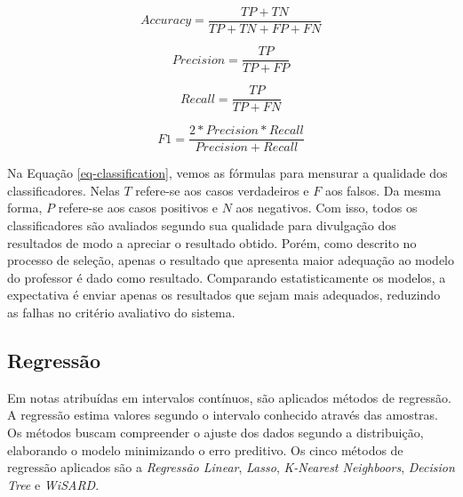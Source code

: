 \begin{equation}
Accuracy = \frac{TP+TN}{TP+TN+FP+FN}
\label{eq-classification}
\end{equation}

\begin{equation*}
Precision = \frac{TP}{TP+FP}
\end{equation*}

\begin{equation*}
Recall = \frac{TP}{TP+FN}
\end{equation*}

\begin{equation*}
F{1} = \frac{2*Precision*Recall}{Precision+Recall}
\end{equation*}

Na Equação \ref{eq-classification}, vemos as fórmulas para mensurar a qualidade dos classificadores. Nelas $ T $ refere-se aos casos verdadeiros e $ F $ aos falsos. Da mesma forma, $ P $ refere-se aos casos positivos e $ N $ aos negativos. Com isso, todos os classificadores são avaliados segundo sua qualidade para divulgação dos resultados de modo a apreciar o resultado obtido. Porém, como descrito no processo de seleção, apenas o resultado que apresenta maior adequação ao modelo do professor é dado como resultado. Comparando estatisticamente os modelos, a expectativa é enviar apenas os resultados que sejam mais adequados, reduzindo as falhas no critério avaliativo do sistema.

\subsection{Regressão}
\label{subsec-regressao}

Em notas atribuídas em intervalos contínuos, são aplicados métodos de regressão. A regressão estima valores segundo o intervalo conhecido através das amostras. Os métodos buscam compreender o ajuste dos dados segundo a distribuição, elaborando o modelo minimizando o erro preditivo. Os cinco métodos de regressão aplicados são a \textit{Regressão Linear}, \textit{Lasso}, \textit{K-Nearest Neighboors}, \textit{Decision Tree} e \textit{WiSARD}.

